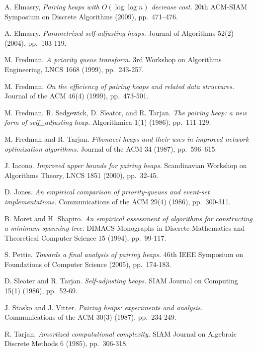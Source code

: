 \begin{thebibliography}{99}


A. Elmasry, {\em Pairing heaps with $O(\log{\log{n}})$ decrease cost.} 
20th ACM-SIAM Symposium on Discrete Algorithms (2009), pp.~471--476.

 A. Elmasry. {\em Parametrized self-adjusting heaps.} 
Journal of Algorithms 52(2) (2004), pp.~103-119.

 M. Fredman. {\em A priority queue transform.} 3rd Workshop on Algorithms Engineering, LNCS 1668 (1999), pp.~243-257. 

 M. Fredman. {\em On the efficiency of pairing heaps and related data structures.} Journal of the ACM 46(4) (1999), pp.~473-501.

 M. Fredman, R. Sedgewick, D. Sleator, and R. Tarjan. {\em The pairing heap: a new form of self\_adjusting heap.} Algorithmica 1(1) (1986), pp.~111-129.

M. Fredman and R. Tarjan. {\em Fibonacci heaps and their uses in improved network optimization algorithms.} Journal of the ACM 34 (1987), pp.~596--615.

 J. Iacono. {\em Improved upper bounds for pairing heaps.} Scandinavian Workshop on Algorithms Theory, LNCS 1851 (2000), pp.~32-45. 

 D. Jones. {\em An empirical comparison of priority-queues and event-set implementations.} Communications of the ACM 29(4) (1986), pp.~300-311.

 B. Moret and H. Shapiro. {\em An empirical assessment of algorithms for constructing a minimum spanning tree.} DIMACS Monographs in Discrete Mathematics and Theoretical Computer Science 15 (1994), pp.~99-117.

 S. Pettie. {\em Towards a final analysis of pairing heaps.}
46th IEEE Symposium on Foundations of Computer Science (2005), pp.~174-183.

 D. Sleater and R. Tarjan. {\em Self-adjusting heaps.} SIAM Journal on Computing 15(1) (1986), pp.~52-69.

 J. Stasko and J. Vitter. {\em Pairing heaps: experiments and analysis.} Communications of the ACM 30(3) (1987), pp.~234-249.

 R. Tarjan. {\em Amortized computational complexity.} SIAM Journal on Algebraic Discrete Methods 6 (1985), pp.~306-318.


\end{thebibliography} 



